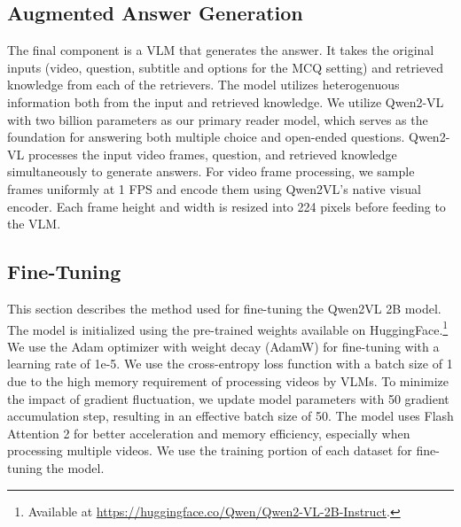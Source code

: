 \begin{itemize}[leftmargin=*]
    
    
   
\end{itemize}




\subsection{Augmented Answer Generation}

The final component is a VLM that generates the answer. It takes the original inputs (video, question, subtitle and options for the MCQ setting) and retrieved knowledge from each of the retrievers. The model utilizes heterogenuous information both from the input and retrieved knowledge. We utilize Qwen2-VL with two billion parameters \cite{wang2024qwen2vl} as our primary reader model, which serves as the foundation for answering both multiple choice and open-ended questions. Qwen2-VL processes the input video frames, question, and retrieved knowledge simultaneously to generate answers. For video frame processing, we sample frames uniformly at 1 FPS and encode them using Qwen2VL's native visual encoder. Each frame height and width is resized into 224 pixels before feeding to the VLM.

\subsection{Fine-Tuning}
This section describes the method used for fine-tuning the Qwen2VL 2B model. The model is initialized using the pre-trained weights available on HuggingFace.\footnote{Available at \url{https://huggingface.co/Qwen/Qwen2-VL-2B-Instruct}.} We use the Adam optimizer with weight decay (AdamW) \cite{loshchilov2017decoupled} for fine-tuning with a learning rate of 1e-5. We use the cross-entropy loss function with a batch size of 1 due to the high memory requirement of processing videos by VLMs. To minimize the impact of gradient fluctuation, we update model parameters with 50 gradient accumulation step, resulting in an effective batch size of 50. The model uses Flash Attention 2 \cite{dao2023flashattention2fasterattentionbetter} for better acceleration and memory efficiency, especially when processing multiple videos. We use the training portion of each dataset for fine-tuning the model.



